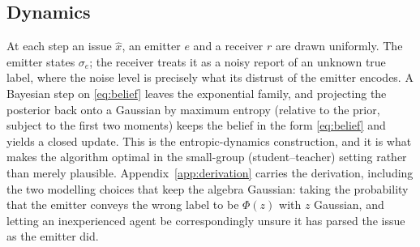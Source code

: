 \documentclass{article}
\begin{document}
\subsection{Dynamics}
\label{sec:dynamics}

At each step an issue $\hat{x}$, an emitter $e$ and a receiver $r$ are drawn
uniformly. The emitter states $\sigma_e$; the receiver treats it as a noisy report
of an unknown true label, where the noise level is precisely what its distrust of
the emitter encodes. A Bayesian step on \eqref{eq:belief} leaves the exponential
family, and projecting the posterior back onto a Gaussian by maximum entropy (relative to the prior, subject to the first
two moments) keeps the belief in the
form \eqref{eq:belief} and yields a closed update. This is the entropic-dynamics
construction, and it is what makes the algorithm optimal in the small-group
(student--teacher) setting rather than merely plausible.
Appendix~\ref{app:derivation} carries the derivation, including the two modelling
choices that keep the algebra Gaussian: taking the probability that the emitter
conveys the wrong label to be $\Phi(z)$ with $z$ Gaussian, and letting an
inexperienced agent be correspondingly unsure it has parsed the issue as the
emitter did.
\end{document}
